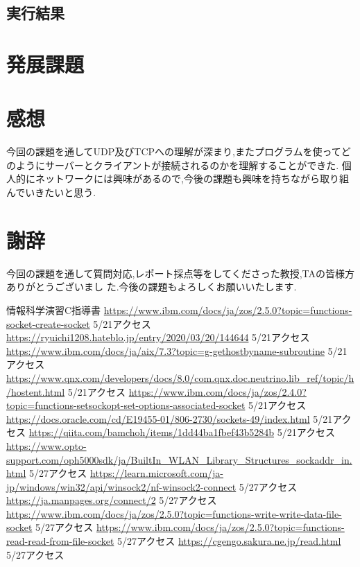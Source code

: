 \documentclass[dvipdfmx]{jarticle}
\begin{document}
\subsection{実行結果}

\section{発展課題}

\section{感想}
今回の課題を通してUDP及びTCPへの理解が深まり,またプログラムを使ってどのようにサーバーとクライアントが接続されるのかを理解することができた.
個人的にネットワークには興味があるので,今後の課題も興味を持ちながら取り組んでいきたいと思う.
\section{謝辞}
今回の課題を通して質問対応,レポート採点等をしてくださった教授,TAの皆様方ありがとうございまし
た.今後の課題もよろしくお願いいたします.
\begin{thebibliography}{99}
    情報科学演習C指導書
     \url{https://www.ibm.com/docs/ja/zos/2.5.0?topic=functions-socket-create-socket} 5/21アクセス
     \url{https://ryuichi1208.hateblo.jp/entry/2020/03/20/144644} 5/21アクセス
     \url{https://www.ibm.com/docs/ja/aix/7.3?topic=g-gethostbyname-subroutine} 5/21アクセス
     \url{https://www.qnx.com/developers/docs/8.0/com.qnx.doc.neutrino.lib_ref/topic/h/hostent.html} 5/21アクセス
     \url{https://www.ibm.com/docs/ja/zos/2.4.0?topic=functions-setsockopt-set-options-associated-socket} 5/21アクセス
     \url{https://docs.oracle.com/cd/E19455-01/806-2730/sockets-49/index.html} 5/21アクセス
     \url{https://qiita.com/bamchoh/items/1dd44ba1fbef43b5284b} 5/21アクセス
     \url{https://www.opto-support.com/oph5000sdk/ja/BuiltIn_WLAN_Library_Structures_sockaddr_in.html} 5/27アクセス
     \url{https://learn.microsoft.com/ja-jp/windows/win32/api/winsock2/nf-winsock2-connect} 5/27アクセス
     \url{https://ja.manpages.org/connect/2} 5/27アクセス
     \url{https://www.ibm.com/docs/ja/zos/2.5.0?topic=functions-write-write-data-file-socket} 5/27アクセス
     \url{https://www.ibm.com/docs/ja/zos/2.5.0?topic=functions-read-read-from-file-socket} 5/27アクセス
     \url{https://cgengo.sakura.ne.jp/read.html} 5/27アクセス
\end{thebibliography}
\end{document}
